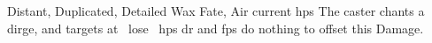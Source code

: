   {Distant, Duplicated, Detailed}%
  {Wax}%
  {Fate, Air}%
  {current \glspl{hp}}%
  {The caster chants a dirge, and  targets at \spellRange\ lose \showDam~\glspl{hp}}%
  {\Gls{dr} and \glspl{fp} do nothing to offset this Damage.}
